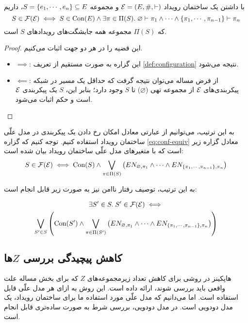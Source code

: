 \begin{theorem}\label{th:conf-equiv}
  با داشتن یک ساختمان رویداد
  $\mathcal{E}=(E,\#,\vdash)$
  و مجموعه
  $S = \left\{ e_1,\cdots,e_n \right\} \subseteq E$،
  داریم
  \begin{equation}\label{eq:conf-equiv}
    S \in \operatorname{\mathcal{F}}(\mathcal{E}) \iff
    S \in \operatorname{Con}(E)
    \wedge \exists \pi \in \Pi(S).\;
    \varnothing \vdash \pi_1 \wedge \cdots \wedge
    \left\{ \pi_1,\cdots,\pi_{n-1} \right\} \vdash \pi_n
  \end{equation}
  که
  $\Pi(S)$
  مجموعه همه جایشگت‌های رویدادهای
  $S$
  است.
\end{theorem}

\begin{proof}
  این قضیه را در هر دو جهت اثبات می‌کنیم.
  \begin{itemize}
    \item $\implies$:
    این گزاره به صورت مستقیم از تعریف
    \ref{def:configuration}
    نتیجه می‌شود.
    \item $\impliedby$:
    از فرض مساله می‌توان نتیجه گرفت که حداقل
    یک مسیر در شبکه پیکربندی‌های
    $\mathcal{E}$
    از مجموعه تهی
    ($\varnothing$)
    تا $S$
    وجود دارد؛ بنابر این،
    $S$
    یک پیکربندی
    $\mathcal{E}$
    است و حکم اثبات می‌شود.
  \end{itemize}
\end{proof}

به این ترتیب، می‌توانیم از عبارتی معادل
امکان رخ دادن یک پیکربندی در مدل علّی ساختمان رویداد
استفاده کنیم. توجه کنیم که گزاره
\ref{eq:conf-equiv}
معادل گزاره زیر است که با متغیرهای مدل علّی
ساختمان رویداد بیان شده است:
\begin{equation}\label{eq:conf-equiv-cm}
  S \in \operatorname{\mathcal{F}}(\mathcal{E}) \iff
  \operatorname{Con}(S) \wedge
  \bigvee_{\pi \in \Pi(S)} \left(
    EN_{\varnothing, \pi_1} \wedge \cdots \wedge
    EN_{\left\{ \pi_1,\cdots,\pi_{n-1} \right\}, \pi_n}
  \right)
\end{equation}

به این ترتیب، توصیف رفتار ناامن نیز به صورت زیر قابل انجام است:

\begin{multline}\label{eq:unsafe-behavior-equiv-cm}
  \exists S' \in S.\;S'\in \operatorname{\mathcal{F}}(\mathcal{E}) \iff \\
  \bigvee_{S' \in S} \left(
    \operatorname{Con}(S') \wedge
    \bigvee_{\pi \in \Pi(S')} \left(
      EN_{\varnothing, \pi_1} \wedge \cdots \wedge
      EN_{\left\{ \pi_1,\cdots,\pi_{n-1} \right\}, \pi_n}
    \right)
  \right)
\end{multline}

\subsection{کاهش پیچیدگی بررسی $Z$ها}
هاپکینز در
\cite{hopkins2002strategies}
روشی برای کاهش تعداد زیرمجموعه‌های
$Z$
که برای بخش
مساله علت واقعی باید بررسی شوند، ارائه داده است.
این روش به ازای هر مدل علّی قابل استفاده است.
اما می‌دانیم که مدل علّی مورد استفاده ما برای ساختمان رویداد،
یک مدل دودویی
است. در مدل دودویی، بررسی شرط
به صورت ساده‌تری قابل انجام است.

